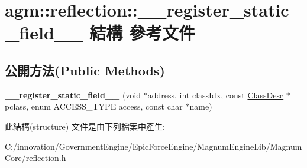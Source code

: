 \hypertarget{structagm_1_1reflection_1_1____register__static__field____}{}\section{agm\+:\+:reflection\+:\+:\+\_\+\+\_\+register\+\_\+static\+\_\+field\+\_\+\+\_\+ 結構 參考文件}
\label{structagm_1_1reflection_1_1____register__static__field____}
\subsection*{公開方法(Public Methods)}
\begin{DoxyCompactItemize}
\item 
{\bfseries \+\_\+\+\_\+register\+\_\+static\+\_\+field\+\_\+\+\_\+} (void $\ast$address, int class\+Idx, const \hyperlink{classagm_1_1reflection_1_1_class_desc}{Class\+Desc} $\ast$pclass, enum A\+C\+C\+E\+S\+S\+\_\+\+T\+Y\+PE access, const char $\ast$name)\hypertarget{structagm_1_1reflection_1_1____register__static__field_____ac1ddcd512e283905c668ccd15df85753}{}\label{structagm_1_1reflection_1_1____register__static__field_____ac1ddcd512e283905c668ccd15df85753}

\end{DoxyCompactItemize}


此結構(structure) 文件是由下列檔案中產生\+:\begin{DoxyCompactItemize}
\item 
C\+:/innovation/\+Government\+Engine/\+Epic\+Force\+Engine/\+Magnum\+Engine\+Lib/\+Magnum\+Core/reflection.\+h\end{DoxyCompactItemize}
